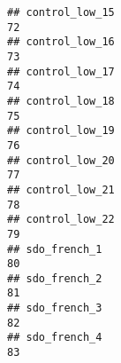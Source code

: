 \documentclass[
]{article}
\begin{document}
\begin{verbatim}
## control_low_15                                                                                                                                                                                                               72
## control_low_16                                                                                                                                                                                                               73
## control_low_17                                                                                                                                                                                                               74
## control_low_18                                                                                                                                                                                                               75
## control_low_19                                                                                                                                                                                                               76
## control_low_20                                                                                                                                                                                                               77
## control_low_21                                                                                                                                                                                                               78
## control_low_22                                                                                                                                                                                                               79
## sdo_french_1                                                                                                                                                                                                                 80
## sdo_french_2                                                                                                                                                                                                                 81
## sdo_french_3                                                                                                                                                                                                                 82
## sdo_french_4                                                                                                                                                                                                                 83

\end{verbatim}
\end{document}
